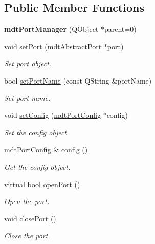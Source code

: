 \subsection*{Public Member Functions}
\begin{DoxyCompactItemize}
\item 
\hypertarget{classmdt_port_manager_a5ec36523089b7528d973e29cdbc64d01}{
{\bfseries mdtPortManager} (QObject $\ast$parent=0)}
\label{classmdt_port_manager_a5ec36523089b7528d973e29cdbc64d01}

\item 
void \hyperlink{classmdt_port_manager_afcd156b2d0c9d340999935efb6cd8cb6}{setPort} (\hyperlink{classmdt_abstract_port}{mdtAbstractPort} $\ast$port)
\begin{DoxyCompactList}\small\item\em Set port object. \end{DoxyCompactList}\item 
bool \hyperlink{classmdt_port_manager_a647f85027ac2ed695a88f23c9f9167eb}{setPortName} (const QString \&portName)
\begin{DoxyCompactList}\small\item\em Set port name. \end{DoxyCompactList}\item 
void \hyperlink{classmdt_port_manager_a087ade14678b0e2470d9f5218ac905ce}{setConfig} (\hyperlink{classmdt_port_config}{mdtPortConfig} $\ast$config)
\begin{DoxyCompactList}\small\item\em Set the config object. \end{DoxyCompactList}\item 
\hyperlink{classmdt_port_config}{mdtPortConfig} \& \hyperlink{classmdt_port_manager_a9cf3ea2da38f81682695b37448712ffd}{config} ()
\begin{DoxyCompactList}\small\item\em Get the config object. \end{DoxyCompactList}\item 
virtual bool \hyperlink{classmdt_port_manager_aab594613e8985590c835194efbc27b5e}{openPort} ()
\begin{DoxyCompactList}\small\item\em Open the port. \end{DoxyCompactList}\item 
void \hyperlink{classmdt_port_manager_ace8065f1f5083041ee7f65c2892bc77d}{closePort} ()
\begin{DoxyCompactList}\small\item\em Close the port. \end{DoxyCompactList}\item 

\end{DoxyCompactItemize}
